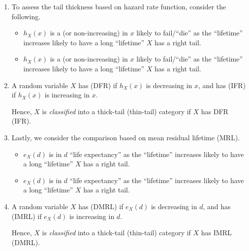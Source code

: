 \begin{enumerate}
\item To assess the tail thickness based on hazard rate function, consider the
following.
\begin{itemize}
\item \(h_X(x)\) is a  (or non-increasing) in \(x\)
  likely to fail/``die'' as the ``lifetime'' increases
  likely to have a long ``lifetime'' 
\(X\) has a  right tail.
\item \(h_X(x)\) is a  (or non-increasing) in \(x\)
  likely to fail/``die'' as the ``lifetime'' increases
  likely to have a long ``lifetime'' 
\(X\) has a  right tail.
\end{itemize}
\item A random variable \(X\) has  (DFR) if
\(h_X(x)\) is decreasing in \(x\), and has  (IFR)
if \(h_X(x)\) is increasing in \(x\).

Hence, \(X\) is \emph{classified} into a thick-tail (thin-tail) category if
\(X\) has DFR (IFR).

\item Lastly, we consider the comparison based on mean residual lifetime (MRL).
\begin{itemize}
\item \(e_X(d)\) is  in \(d\)   ``life
expectancy'' as the ``lifetime'' increases  
likely to have a long ``lifetime''  \(X\) has a 
right tail.

\item \(e_X(d)\) is  in \(d\)  
``life expectancy'' as the ``lifetime'' increases 
 likely to have a long ``lifetime''  \(X\) has a
 right tail.
\end{itemize}

\item A random variable \(X\) has  (DMRL) if
\(e_X(d)\) is decreasing in \(d\), and has  (IMRL) if \(e_X(d)\) is increasing in \(d\).

Hence, \(X\) is \emph{classified} into a thick-tail (thin-tail) category if
\(X\) has IMRL (DMRL).


\end{enumerate}
